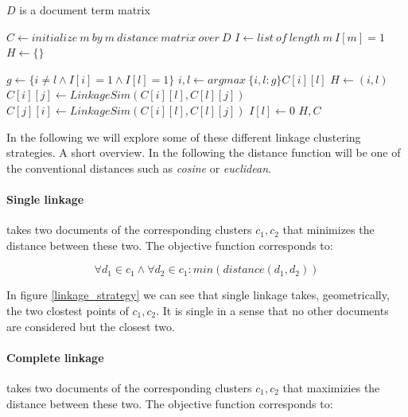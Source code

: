     \begin{algorithm}[H]
    \begin{algorithmic}[1]
      \caption{$D$ is a document term matrix}\label{hac}
        \State $C \gets initialize\:m\:by\:m\:distance\:matrix\:over\:D$
        \State $I \gets list\:of\:length\:m\:I[m]=1$ 
        \State $H \gets \{\}$ 

          \State $g \gets \{i\not=l \wedge I[i]=1 \wedge I[l]=1 \}$
          \State $i,l \gets  argmax\:\{ i,l : g\} C[i][l]$ 
          \State $H \gets (i,l)$ 
           
            \State $C[i][j] \gets LinkageSim(C[i][l], C[l][j])$
            \State $C[j][i] \gets LinkageSim(C[i][l], C[l][j])$
          \EndFor
          \State $I[l] \gets 0$ 
        \EndFor
        \State \Return $H, C$
      \EndFunction
    \end{algorithmic}
    \end{algorithm}

    In the following we will explore some of these different linkage clustering strategies.
    A short overview. In the following the distance function will be one of the conventional distances such as \emph{cosine} or \emph{euclidean}.

    \paragraph{Single linkage} takes two documents of the corresponding clusters $c_1,c_2$ that minimizes the distance between these two. The objective function corresponds to:
      
      \begin{equation}
        \forall d_1 \in c_1 \wedge \forall d_2 \in c_1: min(distance(d_1, d_2))
      \end{equation}

    In figure \ref{linkage_strategy} we can see that single linkage takes, geometrically, the two clostest points of $c_1,c_2$. It is single in a sense that no other documents are considered but the closest two.

    \paragraph{Complete linkage} takes two documents of the corresponding clusters $c_1,c_2$ that maximizies the distance between these two. The objective function corresponds to:
      

